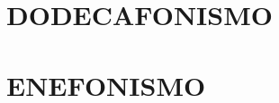 \documentclass[twoside]{book}
\begin{document}
	
    
    
	
	
    \part{DODECAFONISMO}
    
	
    
	\part{ENEFONISMO}%
    
    
%	
%	
    
    
    
	\cleardoublepage
    
	

	\cleardoublepage
    
\end{document}
